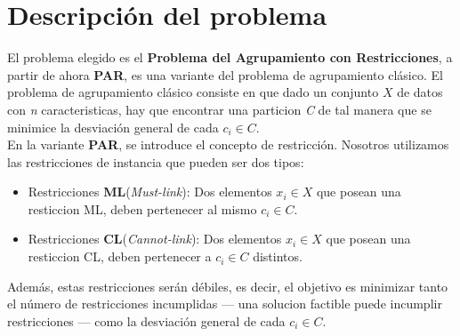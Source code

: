 \newpage
\chapter{Descripción del problema}
El problema elegido es el \textbf{Problema del Agrupamiento con Restricciones}, a partir de ahora \textbf{PAR}, es una variante del problema de agrupamiento clásico.
El problema de agrupamiento clásico consiste en que dado un conjunto $ X $ de datos con \emph{n} caracteristicas, hay que encontrar una particion \emph{C} de tal manera que se minimice la desviación general de cada $ c_{i} \in C $.\\
En la variante \textbf{PAR}, se introduce el concepto de restricción. Nosotros utilizamos las restricciones de instancia que pueden ser dos tipos:
\begin{itemize}
   \item Restricciones \textbf{ML}(\emph{Must-link}): Dos elementos $ x_{i} \in X $ que posean una resticcion ML, deben pertenecer al mismo $ c_{i} \in C $.
   \item Restricciones \textbf{CL}(\emph{Cannot-link}): Dos elementos $ x_{i} \in X $ que posean una resticcion CL, deben pertenecer a $ c_{i} \in C $ distintos.
\end{itemize}
Además, estas restricciones serán débiles, es decir, el objetivo es minimizar tanto el número de restricciones incumplidas --- una solucion factible puede incumplir restricciones --- como la desviación general de cada $ c_{i} \in C $.
